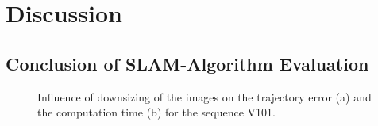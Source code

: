 \chapter{Discussion}

\section{Conclusion of SLAM-Algorithm Evaluation}

% 


	\begin{figure}%
    \centering
	\qquad
    \caption{
	Influence of downsizing of the images on the trajectory error (a) and the computation time (b) for the sequence V101. 
	}%
    \label{fig:resolution}%
	\end{figure}

